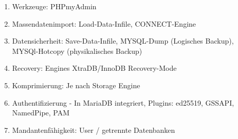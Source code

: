\begin{enumerate}
	\begin{enumerate}
		\item Werkzeuge: PHPmyAdmin
		\item Massendatenimport: Load-Data-Infile, CONNECT-Engine
		\item Datensicherheit: Save-Data-Infile, MYSQL-Dump (Logisches Backup), MYSQl-Hotcopy (physikalisches Backup)
		\item Recovery: Engines XtraDB/InnoDB Recovery-Mode
		\item Komprimierung: Je nach Storage Engine
		\item Authentifizierung - In MariaDB integriert, Plugins: ed25519, GSSAPI, NamedPipe, PAM
		\item Mandantenfähigkeit: User / getrennte Datenbanken
	\end{enumerate}
\end{enumerate}

